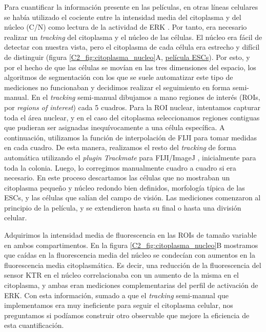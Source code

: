 \documentclass[./main.tex]{subfiles}
\begin{document}
Para cuantificar la información presente en las películas, en otras líneas celulares se había utilizado el cociente entre la intensidad media del citoplasma y del núcleo (C/N) como lectura de la actividad de ERK \cite{Regot2014}. Por tanto, era necesario realizar un \textit{tracking} del citoplasma y el núcleo de las células. El núcleo era fácil de detectar con nuestra vista, pero el citoplasma de cada célula era estrecho y difícil de distinguir (figura \ref{C2_fig:citoplasma_nucleo}A, \href{http://movie.biologists.com/video/10.1242/dev.199710/video-1}{\underline{película ESCs}}). Por esto, y por el hecho de que las células se movían en las tres dimensiones del espacio, los algoritmos de segmentación con los que se suele automatizar este tipo de mediciones no funcionaban y decidimos realizar el seguimiento en forma semi-manual. En el \textit{tracking} semi-manual dibujamos a mano regiones de interés (ROIs, por \textit{regions of interest}) cada 5 cuadros. Para la ROI nuclear, intentamos capturar toda el área nuclear, y en el caso del citoplasma seleccionamos regiones contiguas que pudieran ser asignadas inequívocamente a una célula específica. A continuación, utilizamos la función de interpolación de FIJI para tomar medidas en cada cuadro. De esta manera, realizamos el resto del \textit{tracking} de forma automática utilizando el \textit{plugin} \textit{Trackmate} para FIJI/ImageJ \cite{Tinevez2017}, inicialmente para toda la colonia. Luego, lo corregimos manualmente cuadro a cuadro si era necesario. En este proceso descartamos las células que no mostraban un citoplasma pequeño y núcleo redondo bien definidos, morfología típica de las ESCs, y las células que salían del campo de visión. Las mediciones comenzaron al principio de la película, y se extendieron hasta su final o hasta una división celular. 


Adquirimos la intensidad media de fluorescencia en las ROIs de tamaño variable en ambos compartimentos. En la figura \ref{C2_fig:citoplasma_nucleo}B mostramos que caídas en la fluorescencia media del núcleo se condecían con aumentos en la fluorescencia media citoplasmática. Es decir, una reducción de la fluorescencia del sensor KTR en el núcleo correlacionaba con un aumento de la misma en el citoplasma, y ambas eran mediciones complementarias del perfil de activación de ERK. Con esta información, sumado a que el \textit{tracking} semi-manual que implementamos era muy ineficiente para seguir el citoplasma celular, nos preguntamos si podíamos construir otro observable que mejore la eficiencia de esta cuantificación.
\end{document}
